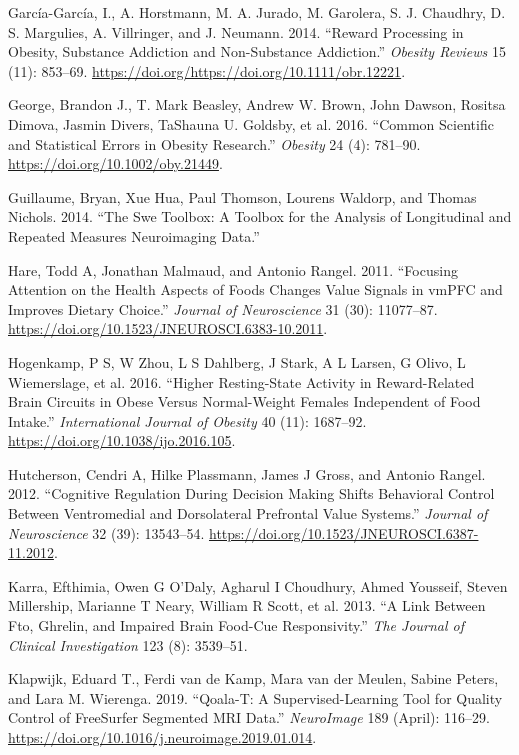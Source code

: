 \documentclass[
]{article}
\begin{document}
\leavevmode\hypertarget{ref-Garcia_2014}{}%
García-García, I., A. Horstmann, M. A. Jurado, M. Garolera, S. J. Chaudhry, D. S. Margulies, A. Villringer, and J. Neumann. 2014. ``Reward Processing in Obesity, Substance Addiction and Non-Substance Addiction.'' \emph{Obesity Reviews} 15 (11): 853--69. \url{https://doi.org/https://doi.org/10.1111/obr.12221}.

\leavevmode\hypertarget{ref-George_2016}{}%
George, Brandon J., T. Mark Beasley, Andrew W. Brown, John Dawson, Rositsa Dimova, Jasmin Divers, TaShauna U. Goldsby, et al. 2016. ``Common Scientific and Statistical Errors in Obesity Research.'' \emph{Obesity} 24 (4): 781--90. \url{https://doi.org/10.1002/oby.21449}.

\leavevmode\hypertarget{ref-Guillaume_2014}{}%
Guillaume, Bryan, Xue Hua, Paul Thomson, Lourens Waldorp, and Thomas Nichols. 2014. ``The Swe Toolbox: A Toolbox for the Analysis of Longitudinal and Repeated Measures Neuroimaging Data.''

\leavevmode\hypertarget{ref-Hare_2011}{}%
Hare, Todd A, Jonathan Malmaud, and Antonio Rangel. 2011. ``Focusing Attention on the Health Aspects of Foods Changes Value Signals in vmPFC and Improves Dietary Choice.'' \emph{Journal of Neuroscience} 31 (30): 11077--87. \url{https://doi.org/10.1523/JNEUROSCI.6383-10.2011}.

\leavevmode\hypertarget{ref-Hogenkamp_2016}{}%
Hogenkamp, P S, W Zhou, L S Dahlberg, J Stark, A L Larsen, G Olivo, L Wiemerslage, et al. 2016. ``Higher Resting-State Activity in Reward-Related Brain Circuits in Obese Versus Normal-Weight Females Independent of Food Intake.'' \emph{International Journal of Obesity} 40 (11): 1687--92. \url{https://doi.org/10.1038/ijo.2016.105}.

\leavevmode\hypertarget{ref-Hutcherson_2012}{}%
Hutcherson, Cendri A, Hilke Plassmann, James J Gross, and Antonio Rangel. 2012. ``Cognitive Regulation During Decision Making Shifts Behavioral Control Between Ventromedial and Dorsolateral Prefrontal Value Systems.'' \emph{Journal of Neuroscience} 32 (39): 13543--54. \url{https://doi.org/10.1523/JNEUROSCI.6387-11.2012}.

\leavevmode\hypertarget{ref-Karra_2013}{}%
Karra, Efthimia, Owen G O'Daly, Agharul I Choudhury, Ahmed Yousseif, Steven Millership, Marianne T Neary, William R Scott, et al. 2013. ``A Link Between Fto, Ghrelin, and Impaired Brain Food-Cue Responsivity.'' \emph{The Journal of Clinical Investigation} 123 (8): 3539--51.

\leavevmode\hypertarget{ref-Klapwijk_2019}{}%
Klapwijk, Eduard T., Ferdi van de Kamp, Mara van der Meulen, Sabine Peters, and Lara M. Wierenga. 2019. ``Qoala-T: A Supervised-Learning Tool for Quality Control of FreeSurfer Segmented MRI Data.'' \emph{NeuroImage} 189 (April): 116--29. \url{https://doi.org/10.1016/j.neuroimage.2019.01.014}.
\end{document}

